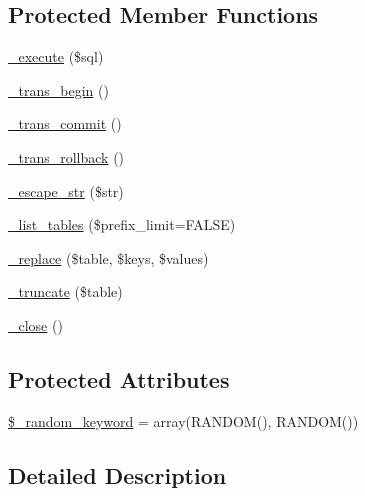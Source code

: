 \subsection*{Protected Member Functions}
\begin{DoxyCompactItemize}
\item 
\mbox{\hyperlink{class_c_i___d_b__sqlite3__driver_a114ab675d89bf8324a41785fb475e86d}{\+\_\+execute}} (\$sql)
\item 
\mbox{\hyperlink{class_c_i___d_b__sqlite3__driver_ac81ac882c1d54347d810199a15856aac}{\+\_\+trans\+\_\+begin}} ()
\item 
\mbox{\hyperlink{class_c_i___d_b__sqlite3__driver_a6fe7f373e0b11cfae23a5f41c0b35dda}{\+\_\+trans\+\_\+commit}} ()
\item 
\mbox{\hyperlink{class_c_i___d_b__sqlite3__driver_ad49a116b0776c26b53114c9093fd102a}{\+\_\+trans\+\_\+rollback}} ()
\item 
\mbox{\hyperlink{class_c_i___d_b__sqlite3__driver_af8ef0237bfcdb19215b63fff769e7a55}{\+\_\+escape\+\_\+str}} (\$str)
\item 
\mbox{\hyperlink{class_c_i___d_b__sqlite3__driver_a435c0f3ce54fe7daa178baa8532ebd54}{\+\_\+list\+\_\+tables}} (\$prefix\+\_\+limit=F\+A\+L\+SE)
\item 
\mbox{\hyperlink{class_c_i___d_b__sqlite3__driver_ae0adf73984daf2d42ad29b66c484c82b}{\+\_\+replace}} (\$table, \$keys, \$values)
\item 
\mbox{\hyperlink{class_c_i___d_b__sqlite3__driver_aa029600528fc1ce660a23ff4b4667f95}{\+\_\+truncate}} (\$table)
\item 
\mbox{\hyperlink{class_c_i___d_b__sqlite3__driver_a4d9082658000e5ede8312067c6dda9db}{\+\_\+close}} ()
\end{DoxyCompactItemize}
\subsection*{Protected Attributes}
\begin{DoxyCompactItemize}
\item 
\mbox{\hyperlink{class_c_i___d_b__sqlite3__driver_a10213aa6e05f6d924d3277bb1d2fea00}{\$\+\_\+random\+\_\+keyword}} = array(\textquotesingle{}R\+A\+N\+D\+OM()\textquotesingle{}, \textquotesingle{}R\+A\+N\+D\+OM()\textquotesingle{})
\end{DoxyCompactItemize}


\subsection{Detailed Description}


